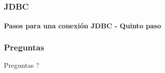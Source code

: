 \documentclass{beamer}
\begin{document}
    \begin{frame}
		\frametitle{JDBC}
		\framesubtitle{Pasos para una conexi\'on JDBC - Quinto paso}

        
	\end{frame}

    \begin{frame}
		\frametitle{Preguntas}

		\hspace{4cm}\huge{Preguntas ?}

	\end{frame}
\end{document}
